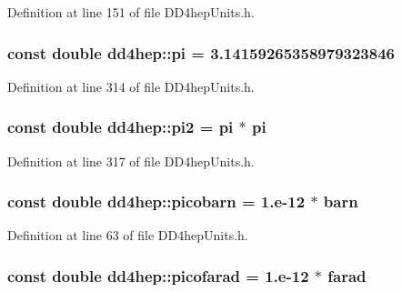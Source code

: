 Definition at line 151 of file DD4hepUnits.h.\hypertarget{namespacedd4hep_ae71f82066d68af053eb8f60d0e13d3af}{
\subsubsection[{pi}]{\setlength{\rightskip}{0pt plus 5cm}const double {\bf dd4hep::pi} = 3.14159265358979323846}}
\label{namespacedd4hep_ae71f82066d68af053eb8f60d0e13d3af}


Definition at line 314 of file DD4hepUnits.h.\hypertarget{namespacedd4hep_a5cf56ca6631717191746c4f24418d5f3}{
\subsubsection[{pi2}]{\setlength{\rightskip}{0pt plus 5cm}const double {\bf dd4hep::pi2} = {\bf pi} $\ast$ {\bf pi}}}
\label{namespacedd4hep_a5cf56ca6631717191746c4f24418d5f3}


Definition at line 317 of file DD4hepUnits.h.\hypertarget{namespacedd4hep_a5b0a18e0239e264a79ce5e86724a0068}{
\subsubsection[{picobarn}]{\setlength{\rightskip}{0pt plus 5cm}const double {\bf dd4hep::picobarn} = 1.e-\/12 $\ast$ {\bf barn}}}
\label{namespacedd4hep_a5b0a18e0239e264a79ce5e86724a0068}


Definition at line 63 of file DD4hepUnits.h.\hypertarget{namespacedd4hep_a1e21414355b7fcaa8bfe810bb0de69a9}{
\subsubsection[{picofarad}]{\setlength{\rightskip}{0pt plus 5cm}const double {\bf dd4hep::picofarad} = 1.e-\/12 $\ast$ {\bf farad}}}
\label{namespacedd4hep_a1e21414355b7fcaa8bfe810bb0de69a9}


